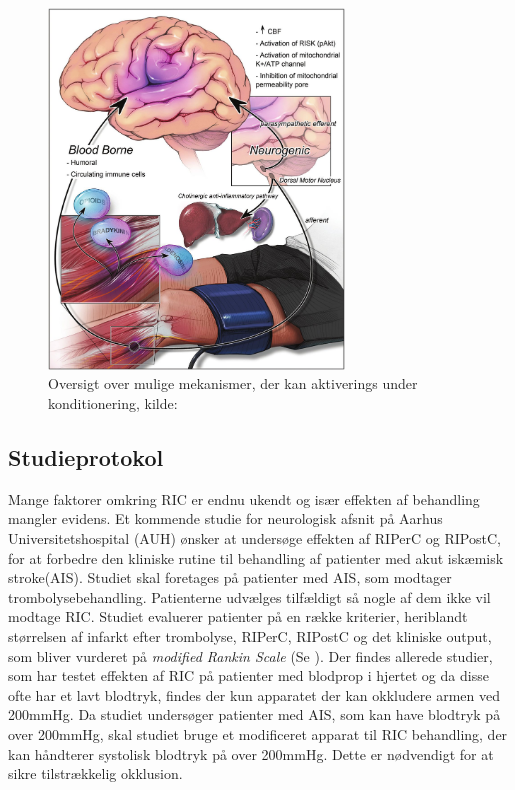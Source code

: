 \begin{figure}[H]
	\centering
	\includegraphics[width = 0.7\textwidth]{billeder/konditioneringsmekanismer.png}
	\caption{Oversigt over mulige mekanismer, der kan aktiverings under konditionering, kilde: \cite{RefWorks:3}} \label{fig:mechanism}
\end{figure}

\subsection{Studieprotokol}\label{title:studieprotokold}
Mange faktorer omkring RIC er endnu ukendt og især effekten af behandling mangler evidens. Et kommende studie for neurologisk afsnit på Aarhus Universitetshospital (AUH) ønsker at undersøge effekten af RIPerC og RIPostC, for at forbedre den kliniske rutine til behandling af patienter med akut iskæmisk stroke(AIS).  Studiet skal foretages på patienter med AIS, som modtager trombolysebehandling. Patienterne udvælges tilfældigt så nogle af dem ikke vil modtage RIC. Studiet evaluerer patienter på en række kriterier, heriblandt størrelsen af infarkt efter trombolyse, RIPerC, RIPostC og det kliniske output, som bliver vurderet på \textit{modified Rankin Scale} (Se ). Der findes allerede studier, som har testet effekten af RIC på patienter med blodprop i hjertet og da disse ofte har et lavt blodtryk, findes der kun apparatet der kan okkludere armen ved 200mmHg. Da studiet undersøger patienter med AIS, som kan have blodtryk på over 200mmHg, skal studiet bruge et modificeret apparat til RIC behandling, der kan håndterer systolisk blodtryk på over 200mmHg. Dette er nødvendigt for at sikre tilstrækkelig okklusion.

